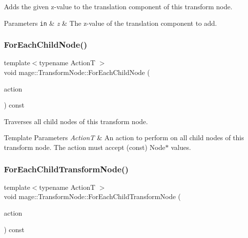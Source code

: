 Adds the given z-\/value to the translation component of this transform node.


\begin{DoxyParams}[1]{Parameters}
\mbox{\tt in}  & {\em z} & The z-\/value of the translation component to add. \\
\hline
\end{DoxyParams}
\hypertarget{structmage_1_1_transform_node_a3dd36b373d27e3526df562ba899f721f}{}\label{structmage_1_1_transform_node_a3dd36b373d27e3526df562ba899f721f} 
\subsubsection{\texorpdfstring{For\+Each\+Child\+Node()}{ForEachChildNode()}}
{\footnotesize\ttfamily template$<$typename ActionT $>$ \\
void mage\+::\+Transform\+Node\+::\+For\+Each\+Child\+Node (\begin{DoxyParamCaption}\item[{ActionT}]{action }\end{DoxyParamCaption}) const\hspace{0.3cm}{\ttfamily [private]}}

Traverses all child nodes of this transform node.


\begin{DoxyTemplParams}{Template Parameters}
{\em ActionT} & An action to perform on all child nodes of this transform node. The action must accept ({\ttfamily const}) {\ttfamily Node$\ast$} values. \\
\hline
\end{DoxyTemplParams}
\hypertarget{structmage_1_1_transform_node_ad9c166b58e3718125d2a51827f8d7ca2}{}\label{structmage_1_1_transform_node_ad9c166b58e3718125d2a51827f8d7ca2} 
\subsubsection{\texorpdfstring{For\+Each\+Child\+Transform\+Node()}{ForEachChildTransformNode()}}
{\footnotesize\ttfamily template$<$typename ActionT $>$ \\
void mage\+::\+Transform\+Node\+::\+For\+Each\+Child\+Transform\+Node (\begin{DoxyParamCaption}\item[{ActionT}]{action }\end{DoxyParamCaption}) const\hspace{0.3cm}{\ttfamily [private]}}

